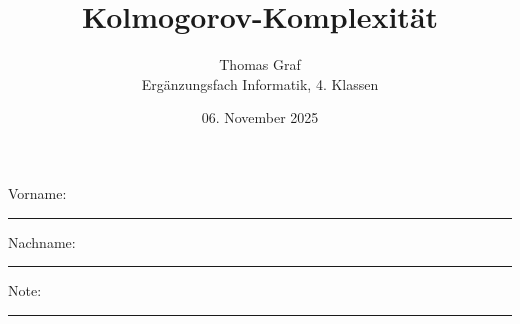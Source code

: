 \newtoggle{withbonus} \toggletrue{withbonus} %

\newcommand{\mycourse}{Ergänzungsfach Informatik}
\newcommand{\myclass}{4. Klassen}
\newcommand{\mydate}{06. November 2025}

\title{\textbf{Kolmogorov-Komplexität}}
\author{Thomas Graf\\
	\mycourse, \myclass}
\date{\mydate}
\maketitle
\thispagestyle{headandfoot}

\begin{center}
\end{center}
\vspace{10mm}

\begin{center}
	Vorname: \rule{45mm}{0.8pt}\qquad Nachname: \rule{45mm}{0.8pt}
\end{center}
\vspace{20mm}

\begin{center}
	\iftoggle{withbonus} {
		\combinedgradetable[h][questions]
	} {
		\gradetable[h][questions]
	}
\end{center}
\vspace{15mm}
\begin{center}
	Note:
	\vspace{10mm}

	\rule{8mm}{1.2pt}
\end{center}
\clearpage


